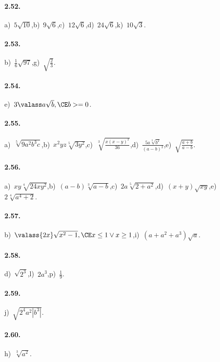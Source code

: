 \paragraph{2.52.}
a)~$5\sqrt{10}$,\quad b)~$9\sqrt 6$,\quad c)~$12\sqrt 6$,\quad d)~$24\sqrt 6$,\quad k)~$10\sqrt 3$.

\paragraph{2.53.}
b)~$\frac 1 6\sqrt{97}$,\quad g)~$\sqrt{\frac 2 3}$.

\paragraph{2.54.}
e)~$3\valass a\sqrt b, \CE b>=0$.

\paragraph{2.55.}
a)~$\sqrt[5]{9a^2b^3c}$,\quad b)~$x^2yz\sqrt[5]{3y^2}$,\quad c)~$\sqrt[3]{\frac{x(x-y)^2}{36}}$,\quad d)~$\frac{5a\sqrt[3]{b^2}}{(a-b)^2}$,\quad e)~$\sqrt{\frac{a+b}{a-b}}$.

\paragraph{2.56.}
a)~$xy\sqrt[4]{24xy^2}$,\quad b)~$(a-b)\sqrt[3]{a-b}$,\quad c)~$2a\sqrt[5]{2+a^2}$,\quad d)~$(x+y)\sqrt{xy}$,\quad e)~$2\sqrt[4]{a^4+2}$.

\paragraph{2.57.}
b)~$\valass{2x}\sqrt{x^2-1}, \CE x\le 1\vee x\ge 1$,\quad i)~$(a+a^2+a^3)\sqrt a$.

\paragraph{2.58.}
d)~$\sqrt{2^3}$,\quad l)~$2a^3$,\quad p)~$\frac 1 9$.

\paragraph{2.59.}
j)~$\sqrt{2^4a^2\left|b^3\right|}$.

\paragraph{2.60.}
h)~$\sqrt[3]{a^2}$.

